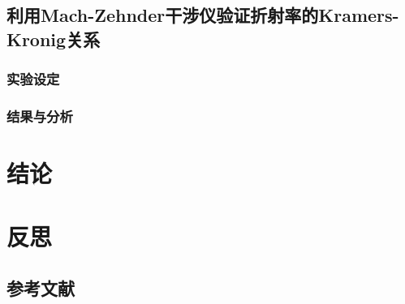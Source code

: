 \documentclass[a4paper, 10pt]{article}
\begin{document}
\begin{multicols}{2}
\subsection{利用Mach-Zehnder干涉仪验证折射率的Kramers-Kronig关系}

\subsubsection{实验设定}

\subsubsection{结果与分析}

\section{结论}

\section{反思}

\begin{appendix}
\section{参考文献}

\end{appendix}
\end{multicols}
\end{document}

